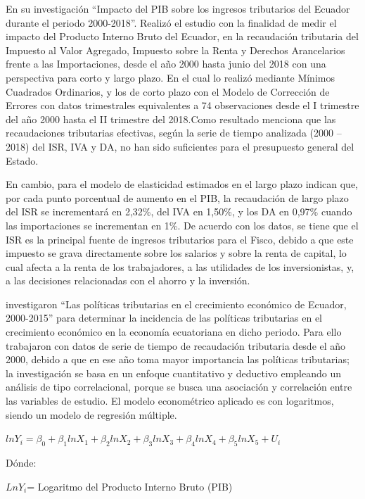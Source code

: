 \documentclass[
  letterpaper,
]{article}
\begin{document}
\textcite{benitez_impacto_2019} En su investigación ``Impacto del PIB
sobre los ingresos tributarios del Ecuador durante el periodo
2000-2018''. Realizó el estudio con la finalidad de medir el impacto del
Producto Interno Bruto del Ecuador, en la recaudación tributaria del
Impuesto al Valor Agregado, Impuesto sobre la Renta y Derechos
Arancelarios frente a las Importaciones, desde el año 2000 hasta junio
del 2018 con una perspectiva para corto y largo plazo. En el cual lo
realizó mediante Mínimos Cuadrados Ordinarios, y los de corto plazo con
el Modelo de Corrección de Errores con datos trimestrales equivalentes a
74 observaciones desde el I trimestre del año 2000 hasta el II trimestre
del 2018.Como resultado menciona que las recaudaciones tributarias
efectivas, según la serie de tiempo analizada (2000 -- 2018) del ISR,
IVA y DA, no han sido suficientes para el presupuesto general del
Estado.

En cambio, para el modelo de elasticidad estimados en el largo plazo
indican que, por cada punto porcentual de aumento en el PIB, la
recaudación de largo plazo del ISR se incrementará en 2,32\%, del IVA en
1,50\%, y los DA en 0,97\% cuando las importaciones se incrementan en
1\%. De acuerdo con los datos, se tiene que el ISR es la principal
fuente de ingresos tributarios para el Fisco, debido a que este impuesto
se grava directamente sobre los salarios y sobre la renta de capital, lo
cual afecta a la renta de los trabajadores, a las utilidades de los
inversionistas, y, a las decisiones relacionadas con el ahorro y la
inversión.

\textcite{nina_politicas_2017} investigaron ``Las políticas tributarias
en el crecimiento económico de Ecuador, 2000-2015'' para determinar la
incidencia de las políticas tributarias en el crecimiento económico en
la economía ecuatoriana en dicho periodo. Para ello trabajaron con datos
de serie de tiempo de recaudación tributaria desde el año 2000, debido a
que en ese año toma mayor importancia las políticas tributarias; la
investigación se basa en un enfoque cuantitativo y deductivo empleando
un análisis de tipo correlacional, porque se busca una asociación y
correlación entre las variables de estudio. El modelo econométrico
aplicado es con logaritmos, siendo un modelo de regresión múltiple.

\(𝑙𝑛𝑌_𝑖 = 𝛽_0 + 𝛽_{1}𝑙𝑛𝑋_1 + 𝛽_{2}𝑙𝑛𝑋_2 + 𝛽_{3}𝑙𝑛𝑋_3 + 𝛽_{4}𝑙𝑛𝑋_4 + 𝛽_{5}𝑙𝑛𝑋_5 + 𝑈_𝑖\)

Dónde:

\(LnY_i\)= Logaritmo del Producto Interno Bruto (PIB)
\end{document}
